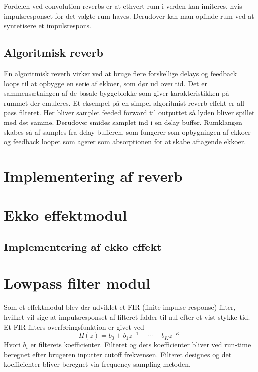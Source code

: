 Fordelen ved convolution reverbs er at ethvert rum i verden kan imiteres, hvis impulsresponset for det valgte rum haves.\newline
Derudover kan man opfinde rum ved at syntetisere et impulsrespons.

\subsection{Algoritmisk reverb}
En algoritmisk reverb virker ved at bruge flere forskellige delays og feedback loops til at opbygge en serie af ekkoer, som dør ud over tid.
Det er sammensætningen af de basale byggeblokke som giver karakteristikken på rummet der emuleres.\newline
Et eksempel på en simpel algoritmist reverb effekt er all-pass filteret.
Her bliver samplet feeded forward til outputtet så lyden bliver spillet med det samme.
Derudover smides samplet ind i en delay buffer.
Rumklangen skabes så af samples fra delay bufferen, som fungerer som opbygningen af ekkoer og feedback loopet som agerer som absorptionen for at skabe aftagende ekkoer.




\section{Implementering af reverb}
\section{Ekko effektmodul}
	\subsection{Implementering af ekko effekt}
	
\section{Lowpass filter modul}
Som et effektmodul blev der udviklet et FIR (finite impulse response) filter, hvilket vil sige at impulsresponset af filteret falder til nul efter et vist stykke tid.\newline
Et FIR filters overføringsfunktion er givet ved
\begin{equation}
H(z) = b_0 + b_1z^{-1} + \cdots + b_Kz^{-K}
\end{equation}
Hvori $b_i$ er filterets koefficienter.\cite[p.218]{Tan2013}\newline
Filteret og dets koefficienter bliver ved run-time beregnet efter brugeren inputter cutoff frekvensen. Filteret designes og det koefficienter bliver beregnet via frequency sampling metoden.
\pagebreak
